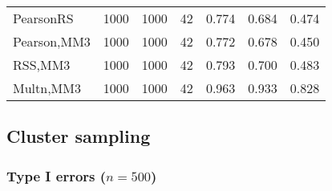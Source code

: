\documentclass[
]{article}
\begin{document}
\begin{table}[H]
{\begin{tabular}[t]{lrrrrrr}
\hspace{1em}PearsonRS & 1000 & 1000 & 42 & 0.774 & 0.684 & 0.474\\
\hspace{1em}Pearson,MM3 & 1000 & 1000 & 42 & 0.772 & 0.678 & 0.450\\
\hspace{1em}RSS,MM3 & 1000 & 1000 & 42 & 0.793 & 0.700 & 0.483\\
\hspace{1em}Multn,MM3 & 1000 & 1000 & 42 & 0.963 & 0.933 & 0.828\\
\bottomrule
\end{tabular}}
\end{table}

\hypertarget{cluster-sampling}{%
\subsection{Cluster sampling}\label{cluster-sampling}}

\hypertarget{type-i-errors-n500-2}{%
\subsubsection{\texorpdfstring{Type I errors
(\(n=500\))}{Type I errors (n=500)}}\label{type-i-errors-n500-2}}
\end{document}
